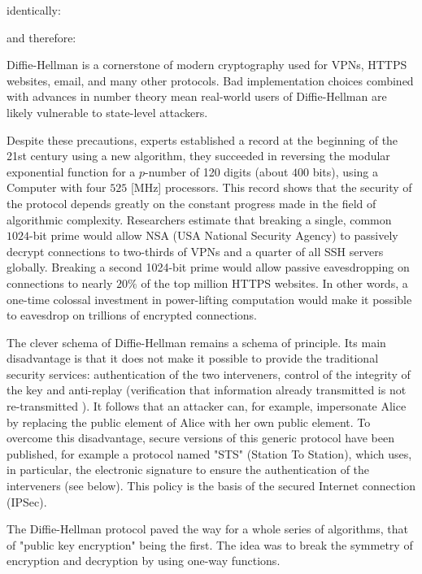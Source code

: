 	identically:
	
	and therefore:
	
	Diffie-Hellman is a cornerstone of modern cryptography used for VPNs, HTTPS websites, email, and many other protocols. Bad implementation choices combined with advances in number theory mean real-world users of Diffie-Hellman are likely vulnerable to state-level attackers. 
	
	Despite these precautions, experts established a record at the beginning of the 21st century using a new algorithm, they succeeded in reversing the modular exponential function for a $p$-number of 120 digits (about $400$ bits), using a Computer with four $525$ [MHz] processors. This record shows that the security of the protocol depends greatly on the constant progress made in the field of algorithmic complexity. Researchers estimate that breaking a single, common $1024$-bit prime would allow NSA (USA National Security Agency) to passively decrypt connections to two-thirds of VPNs and a quarter of all SSH servers globally. Breaking a second 1024-bit prime would allow passive eavesdropping on connections to nearly $20\%$ of the top million HTTPS websites. In other words, a one-time colossal investment in power-lifting computation would make it possible to eavesdrop on trillions of encrypted connections.
	
	The clever schema of Diffie-Hellman remains a schema of principle. Its main disadvantage is that it does not make it possible to provide the traditional security services: authentication of the two interveners, control of the integrity of the key and anti-replay (verification that information already transmitted is not re-transmitted ). It follows that an attacker can, for example, impersonate Alice by replacing the public element of Alice with her own public element. To overcome this disadvantage, secure versions of this generic protocol have been published, for example a protocol named "STS" (Station To Station), which uses, in particular, the electronic signature to ensure the authentication of the interveners (see below). This policy is the basis of the secured Internet connection (IPSec).
	
	The Diffie-Hellman protocol paved the way for a whole series of algorithms, that of "public key encryption" being the first. The idea was to break the symmetry of encryption and decryption by using one-way functions.
	
	\pagebreak
